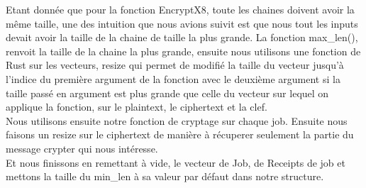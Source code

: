 \documentclass{article}
\begin{document}
Etant donnée que pour la fonction EncryptX8, toute les chaines doivent avoir la même taille, une des intuition que nous avions suivit est que nous tout les inputs devait avoir la taille de la chaine de taille la plus grande. La fonction max\_len(), renvoit la taille de la chaine la plus grande, ensuite nous utilisons une fonction de Rust sur les vecteurs, resize qui permet de modifié la taille du vecteur jusqu'à l'indice du première argument de la fonction avec le deuxième argument si la taille passé en argument est plus grande que celle du vecteur sur lequel on applique la fonction, sur le plaintext, le ciphertext et la clef. \\
Nous utilisons ensuite notre fonction de cryptage sur chaque job. Ensuite nous faisons un resize sur le ciphertext de manière à récuperer seulement la partie du message crypter qui nous intéresse.\\
Et nous finissons en remettant à vide, le vecteur de Job, de Receipts de job et mettons la taille du min\_len à sa valeur par défaut dans notre structure.
\end{document}
